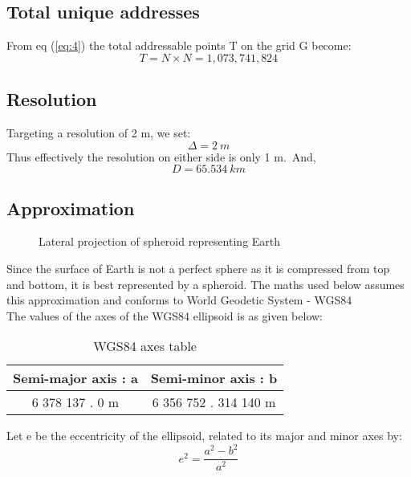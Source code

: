 \documentclass[conference]{IEEEtran}
\begin{document}
\subsection{Total unique addresses}
From eq (\ref{eq:4}) the total addressable points T on the grid G become:
\begin{equation} T = N \times N = 1,073,741,824 \end{equation}


\subsection{Resolution}
Targeting a resolution of 2 m, we set:
\begin{equation}\Delta = 2 \ m\end{equation}
Thus effectively the resolution on either side is only 1 m.\
And,
\begin{equation}D = 65.534\ km\end{equation}

\pagebreak

\subsection{Approximation}
\begin{figure}[htbp]
\centerline{}
\caption{Lateral projection of spheroid representing Earth}
\label{Spheroid}
\end{figure}
Since the surface of Earth is not a perfect sphere as it is compressed from top and bottom, it is best represented by a spheroid.
The maths used below assumes this approximation and conforms to World Geodetic System - WGS84\cite{b1}\\
The values of the axes of the WGS84 ellipsoid is as given below:
\begin{table}[h!]
\caption{WGS84 axes table}
\begin{center}
\bgroup
\def\arraystretch{1.4}%
\begin{tabular}{c|c}
\textbf{Semi-major axis : a} & \textbf{Semi-minor axis : b} \\
\hline
6 378 137 . 0 m & 6 356 752 . 314 140 m\\
\end{tabular}
\egroup
\end{center} \end{table}

Let e be the eccentricity of the ellipsoid, related to its major and minor axes by:
\begin{equation}e^2 =  \frac{a^2-b^2}{a^2}\end{equation}
\end{document}
